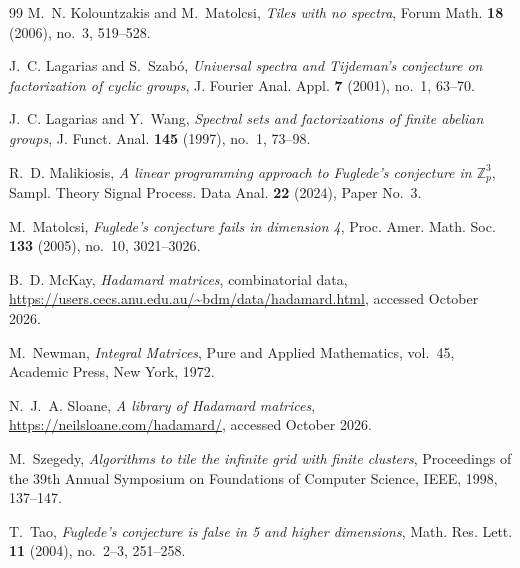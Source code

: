 \documentclass[11pt]{amsart}
\theoremstyle{definition}
\theoremstyle{remark}
\numberwithin{equation}{section}
\numberwithin{table}{section}
\newcommand{\Z}{\mathbb{Z}}
\begin{document}
\begin{thebibliography}{99}
M.~N. Kolountzakis and M.~Matolcsi, \emph{Tiles with no spectra}, Forum Math. \textbf{18} (2006), no.~3, 519--528.

J.~C. Lagarias and S.~Szab\'o, \emph{Universal spectra and Tijdeman's conjecture on factorization of cyclic groups}, J. Fourier Anal. Appl. \textbf{7} (2001), no.~1, 63--70.

J.~C. Lagarias and Y.~Wang, \emph{Spectral sets and factorizations of finite abelian groups}, J. Funct. Anal. \textbf{145} (1997), no.~1, 73--98.

R.~D. Malikiosis, \emph{A linear programming approach to Fuglede's conjecture in $\Z_p^3$}, Sampl. Theory Signal Process. Data Anal. \textbf{22} (2024), Paper No.~3.

M.~Matolcsi, \emph{Fuglede's conjecture fails in dimension 4}, Proc. Amer. Math. Soc. \textbf{133} (2005), no.~10, 3021--3026.

B.~D. McKay, \emph{Hadamard matrices}, combinatorial data, \url{https://users.cecs.anu.edu.au/~bdm/data/hadamard.html}, accessed October 2026.

M.~Newman, \emph{Integral Matrices}, Pure and Applied Mathematics, vol.~45, Academic Press, New York, 1972.

N.~J.~A. Sloane, \emph{A library of Hadamard matrices}, \url{https://neilsloane.com/hadamard/}, accessed October 2026.

M.~Szegedy, \emph{Algorithms to tile the infinite grid with finite clusters}, Proceedings of the 39th Annual Symposium on Foundations of Computer Science, IEEE, 1998, 137--147.

T.~Tao, \emph{Fuglede's conjecture is false in 5 and higher dimensions}, Math. Res. Lett. \textbf{11} (2004), no.~2--3, 251--258.

\end{thebibliography}
\end{document}
